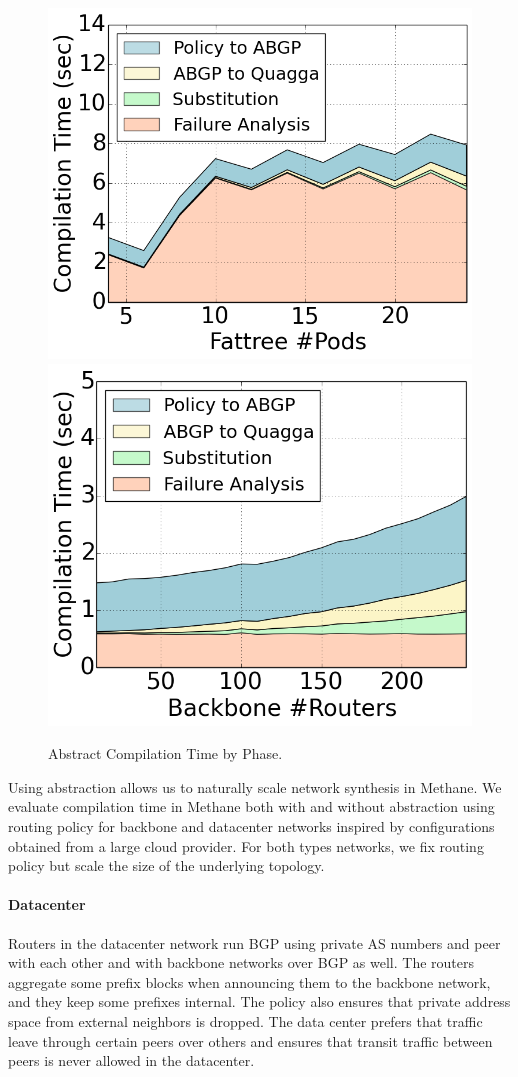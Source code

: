 \documentclass[numbers, 10pt, preprint]{sigplanconf}
\newcommand{\sysname}{{\small \sf Methane}\xspace}
\newcommand{\para}[1]{\paragraph*{\textbf{#1}}}
\begin{document}
\begin{figure}[t!]
    {\includegraphics[width=.49\columnwidth]{figures/Fattree-analysis-time.png}}
    {\includegraphics[width=.49\columnwidth]{figures/backbone-analysis-time.png}} \\
  \caption{Abstract Compilation Time by Phase. \label{fig:abstract-breakdown}}
  \vspace{-1em}
\end{figure}

Using abstraction allows us to naturally scale network synthesis in \sysname. We evaluate compilation time in \sysname both with and without abstraction using routing policy for backbone and datacenter networks inspired by configurations obtained from a large cloud provider. For both types networks, we fix routing policy but scale the size of the underlying topology.


\para{Datacenter}

Routers in the datacenter network run BGP using private AS numbers and peer with each other and with backbone networks over BGP as well. The routers aggregate some prefix blocks when announcing them to the backbone network, and they keep some prefixes internal. The policy also ensures that private address space from external neighbors is dropped. The data center prefers that traffic leave through certain peers over others and ensures that transit traffic between peers is never allowed in the datacenter.
\end{document}

